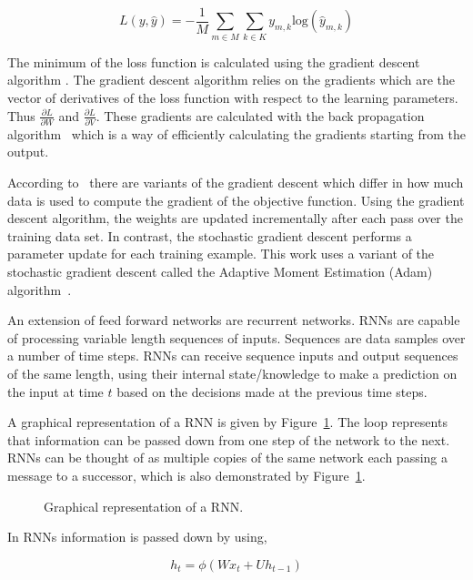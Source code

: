 \begin{equation}\label{eq:cross_entropy}
    L(y, \hat{y}) = - \frac{1}{M} \sum_{m\in M} \sum_{k \in K} y_{m, k} \text{log}(\hat{y}_{m, k})
\end{equation}

The minimum of the loss function is calculated using the gradient descent algorithm
\cite{Ruder2016}. The gradient descent algorithm relies on the gradients which
are the vector of derivatives of the loss function with respect to the learning
parameters. Thus \(\frac{\partial{L}}{\partial{W}}\) and
\(\frac{\partial{L}}{\partial{V}}\). These gradients are calculated with the
back propagation algorithm~\cite{Wythoff1993} which is a way of efficiently
calculating the gradients starting from the output.

According to~\cite{Ruder2016} there are variants of the gradient descent which
differ in how much data is used to compute the gradient of the objective
function. Using the gradient descent algorithm, the weights are updated
incrementally after each pass over the training data set. In contrast, the
stochastic gradient descent performs a parameter update for each training
example. This work uses a variant of the stochastic gradient descent called the
Adaptive Moment Estimation (Adam) algorithm~\cite{Kingma2014}.

An extension of feed forward networks are recurrent networks. RNNs are
capable of processing variable length sequences of inputs. Sequences are data
samples over a number of time steps. RNNs can receive sequence inputs and output
sequences of the same length, using their internal state/knowledge to make a
prediction on the input at time \(t\) based on the decisions made at the
previous time steps.

A graphical representation of a RNN is given by
Figure~\ref{fig:rnn}. The loop represents that information can be passed
down from one step of the network to the next. RNNs can be thought of as
multiple copies of the same network each passing a message to a successor, which
is also demonstrated by Figure~\ref{fig:rnn}.

\begin{figure}[!htbp]
    \centering
    
    \caption{Graphical representation of a RNN.}\label{fig:rnn}
\end{figure}

In RNNs information is passed down by using,

\begin{equation*}
    h_t = \phi(Wx_t + Uh_{t-1})
\end{equation*}

